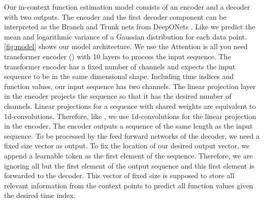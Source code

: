 \label{sec:model}
Our in-context function estimation model consists of an encoder and a decoder with two outputs. The encoder and the first decoder component can be interpreted as the Branch and Trunk nets from DeepONets \citet{Lu_2021}. Like \citet{seifner2025zeroshotimputationfoundationinference} we predict the mean and logarithmic variance of a Gaussian distribution for each data point. \autoref{fig:model} shows our model architecture. We use the Attention is all you need transformer encoder (\citet{vaswani2017attention}) with 10 layers to process the input sequence. The transformer encoder has a fixed number of channels and expects the input sequence to be in the same dimensional shape. Including time indices and function values, our input sequence has two channels. The linear projection layer in the encoder projects the sequence so that it has the desired number of channels. Linear projections for a sequence with shared weights are equivalent to 1d-convolutions. Therefore, like \citet{vaswani2017attention}, we use 1d-convolutions for the linear projection in the encoder. The encoder outputs a sequence of the same length as the input sequence. To be processed by the feed forward networks of the decoder, we need a fixed size vector as output. To fix the location of our desired output vector, we append a learnable token as the first element of the sequence. Therefore, we are ignoring all but the first element of the output sequence and this first element is forwarded to the decoder. This vector of fixed size is supposed to store all relevant information from the context points to predict all function values given the desired time index.

